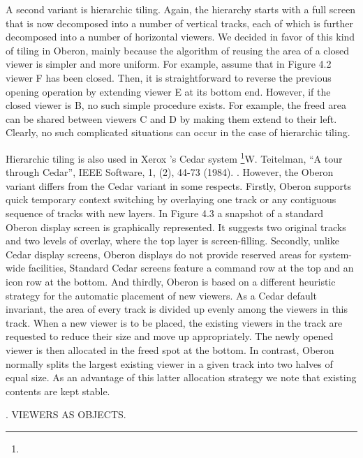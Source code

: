 
A second variant is hierarchic tiling. Again, the hierarchy starts
with a full screen that is now decomposed into a number of vertical
tracks, each of which is further decomposed into a number of
horizontal viewers. We decided in favor of this kind of tiling in
Oberon, mainly because the algorithm of reusing the area of a closed
viewer is simpler and more uniform. For example, assume that in Figure
4.2 viewer F has been closed. Then, it is straightforward to reverse
the previous opening operation by extending viewer E at its bottom
end. However, if the closed viewer is B, no such simple procedure
exists. For example, the freed area can be shared between viewers C
and D by making them extend to their left. Clearly, no such
complicated situations can occur in the case of hierarchic tiling.

Hierarchic tiling is also used in Xerox 's Cedar system
\footnote{{\mc [4]}}{W. Teitelman, ``A tour through Cedar'', IEEE Software, 1, (2), 44-73 (1984).
}. However, the Oberon variant differs from the Cedar
variant in some respects. Firstly, Oberon supports quick temporary
context switching by overlaying one track or any contiguous sequence
of tracks with new layers. In Figure 4.3 a snapshot of a standard
Oberon display screen is graphically represented. It suggests two
original tracks and two levels of overlay, where the top layer is
screen-filling. Secondly, unlike Cedar display screens, Oberon
displays do not provide reserved areas for system-wide facilities,
Standard Cedar screens feature a command row at the top and an icon
row at the bottom. And thirdly, Oberon is based on a different
heuristic strategy for the automatic placement of new viewers. As a
Cedar default invariant, the area of every track is divided up evenly
among the viewers in this track. When a new viewer is to be placed,
the existing viewers in the track are requested to reduce their size
and move up appropriately. The newly opened viewer is then allocated
in the freed spot at the bottom. In contrast, Oberon normally splits
the largest existing viewer in a given track into two halves of equal
size. As an advantage of this latter allocation strategy we note that
existing contents are kept stable.


. VIEWERS AS OBJECTS.


